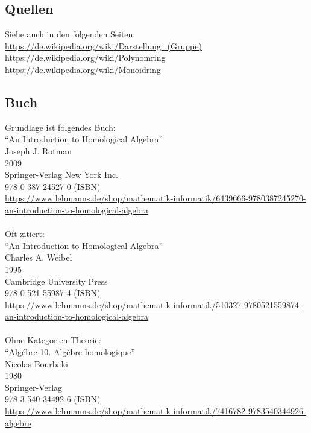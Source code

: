 \documentclass[a4paper]{amsart}
\theoremstyle{definition}
\begin{document}
\subsection*{Quellen}
Siehe auch in den folgenden Seiten:\\
\url{https://de.wikipedia.org/wiki/Darstellung_(Gruppe)}\\
\url{https://de.wikipedia.org/wiki/Polynomring}\\
\url{https://de.wikipedia.org/wiki/Monoidring}

\subsection*{Buch}
Grundlage ist folgendes Buch:\\
"`An Introduction to Homological Algebra"'\\
Joseph J. Rotman\\
2009\\
Springer-Verlag New York Inc.\\
978-0-387-24527-0 (ISBN)\\
{\tiny
   \url{https://www.lehmanns.de/shop/mathematik-informatik/6439666-9780387245270-an-introduction-to-homological-algebra}}\\
\\
Oft zitiert:\\
"`An Introduction to Homological Algebra"'\\
Charles A. Weibel\\
1995\\
Cambridge University Press\\
978-0-521-55987-4 (ISBN)\\
{\tiny
   \url{https://www.lehmanns.de/shop/mathematik-informatik/510327-9780521559874-an-introduction-to-homological-algebra}}\\
\\
Ohne Kategorien-Theorie:\\
"`Algébre 10. Algèbre homologique"'\\
Nicolas Bourbaki\\
1980\\
Springer-Verlag \\
978-3-540-34492-6 (ISBN)\\
{\tiny
   \url{https://www.lehmanns.de/shop/mathematik-informatik/7416782-9783540344926-algebre}}
\end{document}
